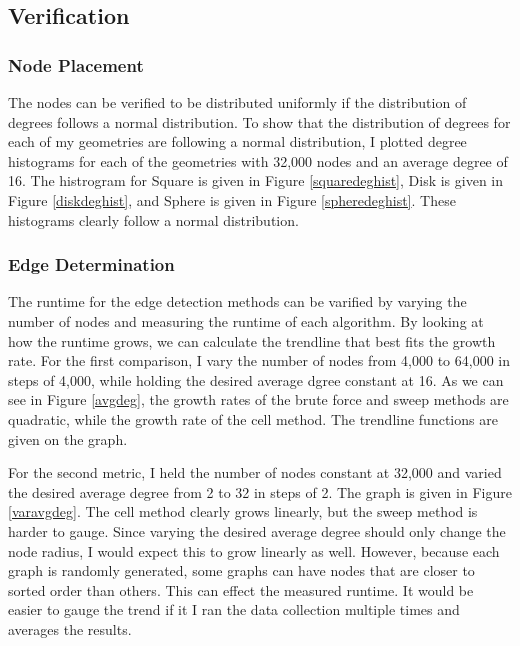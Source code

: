 \documentclass{article}
\begin{document}
    \subsection{Verification}

        \subsubsection{Node Placement}
        The nodes can be verified to be distributed uniformly if the distribution of degrees follows a normal distribution. To show that the distribution of degrees for each of my geometries are following a normal distribution, I plotted degree histograms for each of the geometries with 32,000 nodes and an average degree of 16. The histrogram for Square is given in Figure \ref{squaredeghist}, Disk is given in Figure \ref{diskdeghist}, and Sphere is given in Figure \ref{spheredeghist}. These histograms clearly follow a normal distribution.

        \subsubsection{Edge Determination}
        The runtime for the edge detection methods can be varified by varying the number of nodes and measuring the runtime of each algorithm. By looking at how the runtime grows, we can calculate the trendline that best fits the growth rate. For the first comparison, I vary the number of nodes from 4,000 to 64,000 in steps of 4,000, while holding the desired average dgree constant at 16. As we can see in Figure \ref{avgdeg}, the growth rates of the brute force and sweep methods are quadratic, while the growth rate of the cell method. The trendline functions are given on the graph.
        \par
        For the second metric, I held the number of nodes constant at 32,000 and varied the desired average degree from 2 to 32 in steps of 2. The graph is given in Figure \ref{varavgdeg}. The cell method clearly grows linearly, but the sweep method is harder to gauge. Since varying the desired average degree should only change the node radius, I would expect this to grow linearly as well. However, because each graph is randomly generated, some graphs can have nodes that are closer to sorted order than others. This can effect the measured runtime. It would be easier to gauge the trend if it I ran the data collection multiple times and averages the results.
\end{document}

